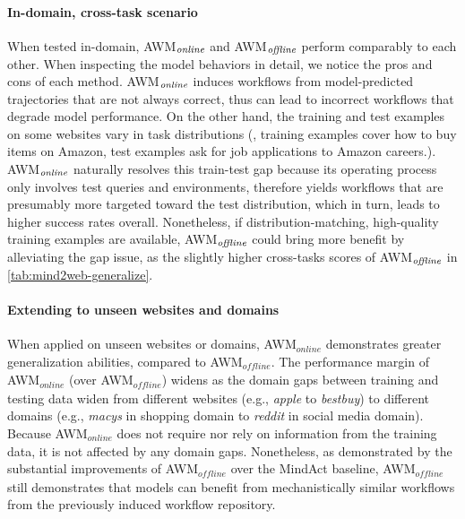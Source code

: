 \paragraph{In-domain, cross-task scenario}
When tested in-domain, \textsc{AWM$_{\it online}$} and \textsc{AWM$_{\it offline}$} perform comparably to each other. When inspecting the model behaviors in detail, we notice the pros and cons of each method.
%
\textsc{AWM$_{\it online}$} induces workflows from model-predicted trajectories that are not always correct, thus can lead to incorrect workflows that degrade model performance.
%
On the other hand, the training and test examples on some websites vary in task distributions (\eg, training examples cover how to buy items on Amazon, test examples ask for job applications to Amazon careers.).
\textsc{AWM$_{\it online}$} naturally resolves this train-test gap because its operating process only involves test queries and environments, therefore yields workflows that are presumably more targeted toward the test distribution, which in turn, leads to higher success rates overall. Nonetheless, if distribution-matching, high-quality training examples are available, \textsc{AWM$_{\it offline}$} could bring more benefit by alleviating the gap issue, as the slightly higher cross-tasks scores of \textsc{AWM$_{\it offline}$} in \autoref{tab:mind2web-generalize}.

\paragraph{Extending to unseen websites and domains}
When applied on unseen websites or domains, \textsc{AWM$_\mathit{online}$} demonstrates greater generalization abilities, compared to \textsc{AWM$_\mathit{offline}$}. 
The performance margin of \textsc{AWM$_\mathit{online}$} (over \textsc{AWM$_\mathit{offline}$}) widens as the domain gaps between training and testing data widen from different websites (e.g., \textit{apple} to \textit{bestbuy}) to different domains (e.g., \textit{macys} in shopping domain to \textit{reddit} in social media domain). Because \textsc{AWM$_\mathit{online}$} does not require nor rely on information from the training data, it is not affected by any domain gaps.
Nonetheless, as demonstrated by the substantial improvements of \textsc{AWM$_\mathit{offline}$} over the MindAct baseline, \textsc{AWM$_\mathit{offline}$} still demonstrates that models can benefit from mechanistically similar workflows from the previously induced workflow repository.